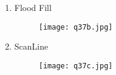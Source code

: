 \begin{enumerate}[label=\arabic*)]
\begin{enumerate}[label=\alph*.]
					\item Flood Fill 
					
					 \begin{figure}[ht]
      						\centering
      						\texttt{[image: q37b.jpg]}
  					\end{figure}

					\newpage
		
					\item ScanLine 					
					
					\begin{figure}[ht]
      						\centering
      						\texttt{[image: q37c.jpg]}
  					\end{figure}	
  					
 			  \end{enumerate}
 			 
   \end{enumerate}
